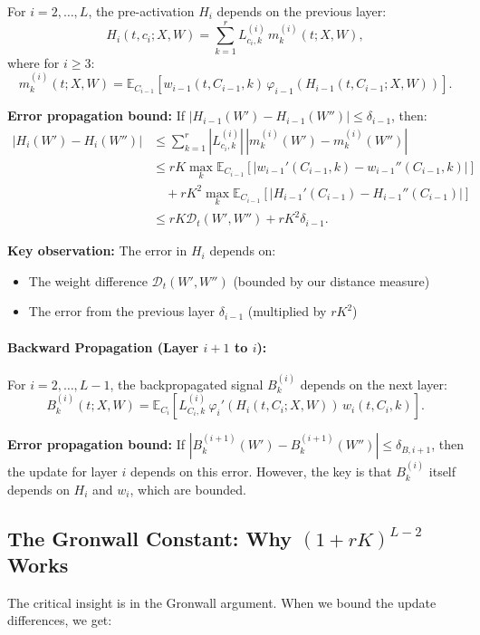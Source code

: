 For $i = 2, \ldots, L$, the pre-activation $H_i$ depends on the previous layer:
\[
H_i(t, c_i; X, W) = \sum_{k=1}^r L^{(i)}_{c_i,k}\, m_k^{(i)}(t; X, W),
\]
where for $i \ge 3$:
\[
m_k^{(i)}(t; X, W) = \mathbb{E}_{C_{i-1}}[w_{i-1}(t, C_{i-1}, k)\,\varphi_{i-1}(H_{i-1}(t, C_{i-1}; X, W))].
\]

\textbf{Error propagation bound:} If $|H_{i-1}(W') - H_{i-1}(W'')| \le \delta_{i-1}$, then:
\begin{align*}
|H_i(W') - H_i(W'')| &\le \sum_{k=1}^r |L^{(i)}_{c_i,k}|\,|m_k^{(i)}(W') - m_k^{(i)}(W'')|\\
&\le rK \max_k \mathbb{E}_{C_{i-1}}[|w_{i-1}'(C_{i-1}, k) - w_{i-1}''(C_{i-1}, k)|]\\
&\quad + rK^2 \max_k \mathbb{E}_{C_{i-1}}[|H_{i-1}'(C_{i-1}) - H_{i-1}''(C_{i-1})|]\\
&\le rK \mathscr{D}_t(W', W'') + rK^2 \delta_{i-1}.
\end{align*}

\textbf{Key observation:} The error in $H_i$ depends on:
\begin{itemize}
\item The weight difference $\mathscr{D}_t(W', W'')$ (bounded by our distance measure)
\item The error from the previous layer $\delta_{i-1}$ (multiplied by $rK^2$)
\end{itemize}

\paragraph*{Backward Propagation (Layer $i+1$ to $i$):}

For $i = 2, \ldots, L-1$, the backpropagated signal $B_k^{(i)}$ depends on the next layer:
\[
B_k^{(i)}(t; X, W) = \mathbb{E}_{C_i}[L^{(i)}_{C_i,k}\,\varphi_i'(H_i(t, C_i; X, W))\,w_i(t, C_i, k)].
\]

\textbf{Error propagation bound:} If $|B_k^{(i+1)}(W') - B_k^{(i+1)}(W'')| \le \delta_{B,i+1}$, then the update for layer $i$ depends on this error. However, the key is that $B_k^{(i)}$ itself depends on $H_i$ and $w_i$, which are bounded.

\subsection{The Gronwall Constant: Why $(1+rK)^{L-2}$ Works}

The critical insight is in the Gronwall argument. When we bound the update differences, we get:

